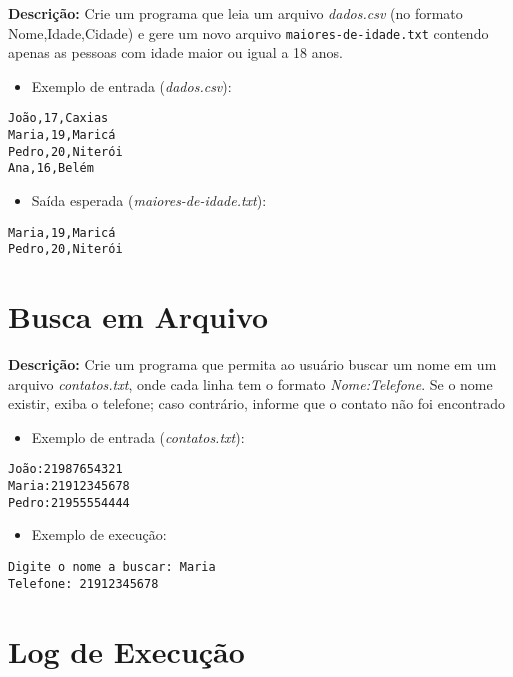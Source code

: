 \textbf{Descrição:} Crie um programa que leia um arquivo \textit{dados.csv} (no formato Nome,Idade,Cidade) e gere um novo arquivo \texttt{maiores-de-idade.txt} contendo apenas as pessoas com idade maior ou igual a 18 anos.

\begin{itemize}
    \item Exemplo de entrada (\textit{dados.csv}):
\end{itemize}

\begin{verbatim}
João,17,Caxias
Maria,19,Maricá
Pedro,20,Niterói
Ana,16,Belém
\end{verbatim}
\begin{itemize}
    \item Saída esperada (\textit{maiores-de-idade.txt}):
\end{itemize}
\begin{verbatim}
Maria,19,Maricá
Pedro,20,Niterói
\end{verbatim}


\section{Busca em Arquivo}

\textbf{Descrição:} Crie um programa que permita ao usuário buscar um nome em um arquivo \textit{contatos.txt}, onde cada linha tem o formato \textit{Nome:Telefone}. Se o nome existir, exiba o telefone; caso contrário, informe que o contato não foi encontrado

\begin{itemize}
    \item Exemplo de entrada (\textit{contatos.txt}):
\end{itemize}

\begin{verbatim}
João:21987654321
Maria:21912345678
Pedro:21955554444
\end{verbatim}


\begin{itemize}
    \item Exemplo de execução:
\end{itemize}

\begin{verbatim}
Digite o nome a buscar: Maria
Telefone: 21912345678      
\end{verbatim}

\section{Log de Execução}

